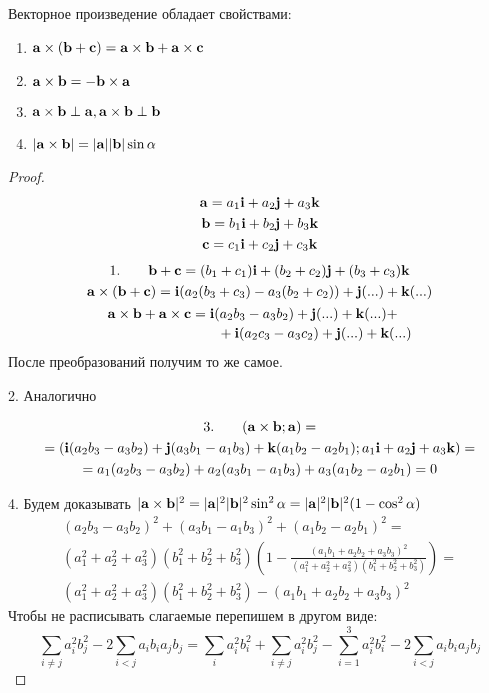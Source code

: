 \documentclass[main]{subfiles}
\begin{document}
\begin{theorem}
    Векторное произведение обладает свойствами:
    \begin{enumerate}
        \item $\mathbf{a} \times (\mathbf{b} + \mathbf{c}) = \mathbf{a} \times \mathbf{b} + \mathbf{a} \times \mathbf{c}$
        \item $\mathbf{a} \times \mathbf{b} = -\mathbf{b} \times \mathbf{a}$
        \item $\mathbf{a} \times \mathbf{b} \perp \mathbf{a}, \mathbf{a} \times \mathbf{b} \perp \mathbf{b}$
        \item $|\mathbf{a} \times \mathbf{b}| = |\mathbf{a}||\mathbf{b}|\sin\alpha$
    \end{enumerate}
\end{theorem}
\begin{proof}
    \begin{gather*}
        \mathbf{a} = a_1 \mathbf{i} + a_2 \mathbf{j} + a_3 \mathbf{k}\\
        \mathbf{b} = b_1 \mathbf{i} + b_2 \mathbf{j} + b_3 \mathbf{k}\\
        \mathbf{c} = c_1 \mathbf{i} + c_2 \mathbf{j} + c_3 \mathbf{k}
    \end{gather*}
    \begin{gather*}
        1. \qquad \vb+\vc = (b_1 + c_1) \vi + (b_2+c_2) \vj + (b_3+c_3)\vk\\
        \va \times (\vb+\vc) = \vi (a_2(b_3+c_3) - a_3 (b_2+c_2))+\vj(...)+\vk(...)\\
        \begin{multlined}
            \va \times \vb + \va \times \vc = \vi (a_2 b_3 - a_3 b_2)+\vj(...)+\vk(...)+\\
            +\vi (a_2 c_3 - a_3 c_2)+\vj(...)+\vk(...)
        \end{multlined}
    \end{gather*}
    После преобразований получим то же самое.

    2. Аналогично

    \begin{multline*}
        3. \qquad (\mathbf{a}\times\mathbf{b}; \mathbf{a}) = \\
        = (\mathbf{i} (a_2 b_3 - a_3 b_2)+ \mathbf{j} (a_3 b_1 - a_1 b_3) + \mathbf{k} (a_1 b_2 - a_2 b_1);
        a_1 \mathbf{i} + a_2 \mathbf{j} + a_3 \mathbf{k}) = \\
        =a_1 (a_2 b_3 - a_3 b_2)+ a_2 (a_3 b_1 - a_1 b_3) + a_3 (a_1 b_2 - a_2 b_1) = 0
    \end{multline*}

    4. Будем доказывать
    $|\mathbf{a} \times \mathbf{b}|^2 = |\mathbf{a}|^2 |\mathbf{b}|^2 \sin^2 \alpha = |\mathbf{a}|^2 |\mathbf{b}|^2 (1 - \cos^2 \alpha)$
    \begin{multline*}
        (a_2 b_3 - a_3 b_2)^2+(a_3 b_1 - a_1 b_3)^2+(a_1 b_2 - a_2 b_1)^2 =\\
        (a_1^2 + a_2^2 + a_3^2)(b_1^2 + b_2^2 + b_3^2)\left(1 -
        \frac{(a_1 b_1 + a_2 b_2 + a_3 b_3)^2}{(a_1^2 + a_2^2 + a_3^2)(b_1^2 + b_2^2 + b_3^2)}\right)=\\
        (a_1^2 + a_2^2 + a_3^2)(b_1^2 + b_2^2 + b_3^2) - (a_1 b_1 + a_2 b_2 + a_3 b_3)^2
    \end{multline*}
    Чтобы не расписывать слагаемые перепишем в другом виде:
    \[\sum_{i\neq j} a_i^2 b_j^2 - 2 \sum_{i<j} a_i b_i a_j b_j =
        \sum_i a_i^2 b_i^2 + \sum_{i \neq j} a_i^2 b_j^2
        - \sum_{i=1}^3 a_i^2 b_i^2 - 2 \sum_{i<j} a_i b_i a_j b_j\]
\end{proof}
\end{document}
